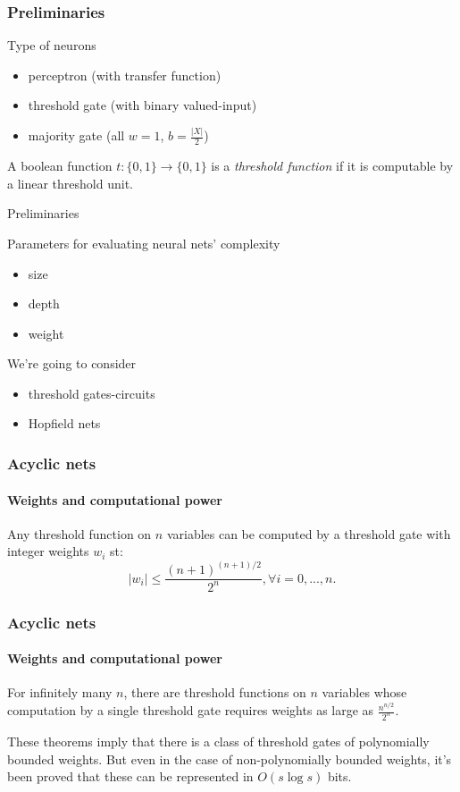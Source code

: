 \documentclass{beamer}
\begin{document}
\begin{frame}
\frametitle{Preliminaries}
Type of neurons
\begin{itemize}
	\item perceptron (with transfer function)
	\item threshold gate (with binary valued-input)
	\item majority gate (all $w=1$, $b=\frac{|X|}{2}$)
\end{itemize}
\begin{definition}
	\justify
	A boolean function $t: \{0,1\} \to \{0,1\} $ is a \textit{threshold function} if it is computable by a linear threshold unit.
\end{definition}
\end{frame}

\begin{frame}{Preliminaries}

Parameters for evaluating neural nets' complexity
\begin{itemize}
	\item size
	\item depth
	\item weight
\end{itemize}
We're going to consider
\begin{itemize}
\item threshold gates-circuits
\item Hopfield nets
\end{itemize}
\end{frame}

\begin{frame}
\frametitle{Acyclic nets}
\framesubtitle{Weights and computational power}	
	\begin{theorem}
		\justify
		Any threshold function on $n$ variables can be computed by a threshold gate with integer weights $w_i$ st: $$|w_i| \leq \frac{(n+1)^{(n+1)/2}}{2^n}, \forall i =0,...,n.$$
	\end{theorem}
\end{frame}

\begin{frame}
\justify
\frametitle{Acyclic nets}
\framesubtitle{Weights and computational power}	
\begin{theorem}
	\justify
For infinitely many $n$, there are threshold functions on $n$ variables whose computation by a single threshold gate requires weights as large as $\frac{n^{n/2}}{2^n}.$
\end{theorem}
These theorems imply that there is a class of threshold gates of polynomially bounded weights. But even in the case of non-polynomially bounded weights, it's been proved that these can be represented in $O(s \log{s})$ bits.
\end{frame}
\end{document}
